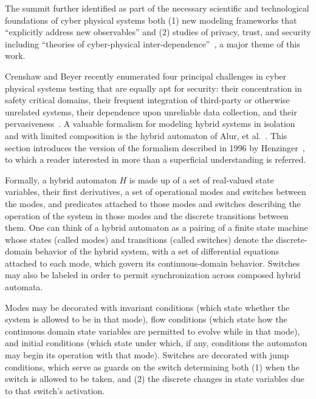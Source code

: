 The summit further identified as part of the necessary scientific and technological foundations of
cyber physical systems both (1) new modeling frameworks that ``explicitly address new observables'' and (2)
studies of privacy, trust, and security including ``theories of cyber-physical inter-dependence''~\cite{summitreport2008},
a major theme of this work.

Crenshaw and Beyer recently enumerated four principal challenges in cyber physical systems testing that are
equally apt for security:
their concentration in safety critical domains, their frequent integration of third-party or
otherwise unrelated systems, their dependence upon unreliable data collection, and their
pervasiveness~\cite{crenshaw2010upbot}.
A valuable formalism for modeling hybrid systems in isolation and with limited composition
is the hybrid automaton of Alur, et al.~\cite{alur1993hybrid}. This section introduces the
version of the formalism described in 1996 by Henzinger~\cite{henzinger1996theory}, to which a
reader interested in more than a superficial understanding is referred. 

Formally,
a hybrid automaton $H$ is made up of a set of real-valued state variables, their first derivatives,
a set of operational modes and switches between the modes, and predicates attached to those modes and
switches describing the operation of the system in those modes and the discrete transitions between
them. One can think of a hybrid automaton as a pairing of a finite state machine whose states (called
modes) and transitions (called switches) denote the discrete-domain behavior of the hybrid system, with
a set of differential equations attached to each mode, which govern its continuous-domain behavior. Switches
may also be labeled in order to permit synchronization across composed hybrid automata.

Modes may be decorated with invariant conditions (which state whether the system is allowed to be in that mode),
flow conditions (which state how the continuous domain state variables are permitted to evolve while in that
mode), and initial conditions (which state under which, if any, conditions the automaton may begin its operation
with that mode). Switches are decorated with jump conditions, which serve as guards on the switch determining
both (1) when the switch is allowed to be taken, and (2) the discrete changes in state variables due to that
switch's activation.

